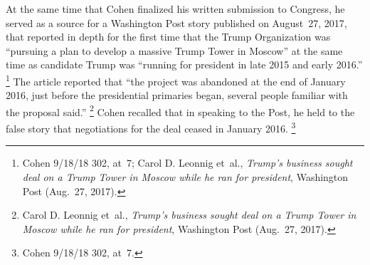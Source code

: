 At the same time that Cohen finalized his written submission to Congress, he served as a source for a Washington Post story published on August~27, 2017, that reported in depth for the first time that the Trump Organization was ``pursuing a plan to develop a massive Trump Tower in Moscow'' at the same time as candidate Trump was ``running for president in late 2015 and early 2016.''%
\footnote{Cohen 9/18/18 302, at~7;
Carol D. Leonnig et~al., \textit{Trump's business sought deal on a Trump Tower in Moscow while he ran for president}, Washington Post (Aug.~27, 2017).}
The article reported that ``the project was abandoned at the end of January 2016, just before the presidential primaries began, several people familiar with the proposal said.''%
\footnote{Carol D. Leonnig et~al., \textit{Trump's business sought deal on a Trump Tower in Moscow while he ran for president}, Washington Post (Aug.~27, 2017).}
Cohen recalled that in speaking to the Post, he held to the false story that negotiations for the deal ceased in January 2016.%
\footnote{Cohen 9/18/18 302, at~7.}

